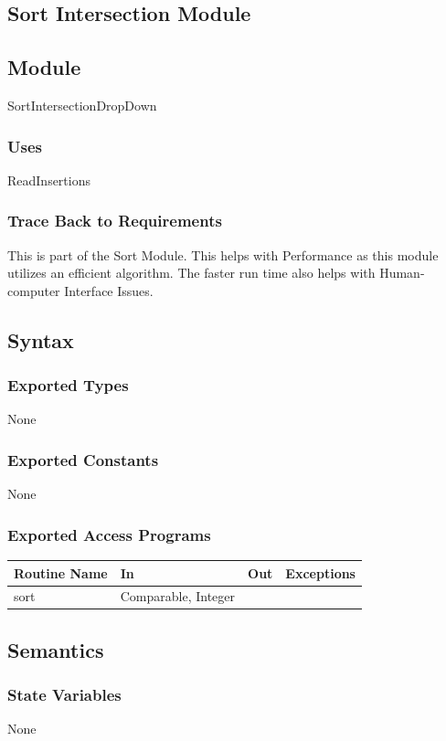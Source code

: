 \documentclass[12pt]{article}
\begin{document}
\newpage
\subsection{Sort Intersection Module}
\subsection*{Module}
SortIntersectionDropDown

\subsubsection*{Uses}
ReadInsertions

\subsubsection*{Trace Back to Requirements}
This is part of the Sort Module. This helps with Performance as this module utilizes an efficient algorithm. The faster run time also helps with Human-computer Interface Issues.

\subsection*{Syntax}
\subsubsection*{Exported Types}
None

\subsubsection*{Exported Constants}
None

\subsubsection*{Exported Access Programs}
    \begin{tabular}{|l|l|l|l|}
    \hline
    \textbf{Routine Name} & \textbf{In} & \textbf{Out} & \textbf{Exceptions}\\
    \hline
    sort & Comparable, Integer & ~ & ~\\
    \hline
    \end{tabular}
    
\subsection*{Semantics}
\subsubsection*{State Variables}
None
\end{document}
